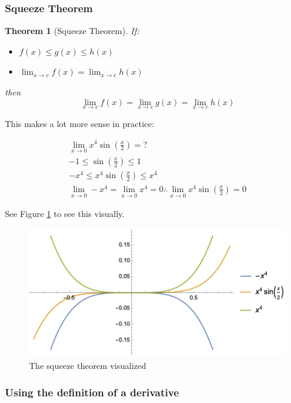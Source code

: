 \documentclass[12pt]{article}
\newtheorem{theorem}{Theorem}
\begin{document}
\subsubsection{Squeeze Theorem}

\begin{theorem}[Squeeze Theorem]
If: 
    \begin{itemize}
        \item $f(x) \leq g(x) \leq h(x)$ 

        \item $\lim_{x \to c} f(x) = \lim_{x \to c} h(x)$

    \end{itemize}
then \[\lim_{x\to c} f(x) = \lim_{x \to c} g(x) = \lim_{x \to c} h(x)\]
\end{theorem}

This makes a lot more sense in practice:

\begin{equation}
    \begin{split}
        \lim_{x\to0} x^4 \sin(\frac{x}{2}) = ?\\
        -1 \leq \sin(\frac{x}{2}) \leq 1\\
        -x^4 \leq x^4 \sin(\frac{x}{2}) \leq x^4\\
        \lim_{x\to 0} -x^4 = \lim_{x\to 0} x^4 = 0 \therefore \lim_{x\to0} x^4 \sin(\frac{x}{2}) = 0
    \end{split}
\end{equation}

See Figure \ref{squeeze} to see this visually.

\begin{figure}[!ht]
    \centering
    \includegraphics[width=12.0cm]{misc/squeezetheorem.png}
    \caption{The squeeze theorem visualized}
    \label{squeeze}
\end{figure}

\subsubsection{Using the definition of a derivative}
\end{document}
